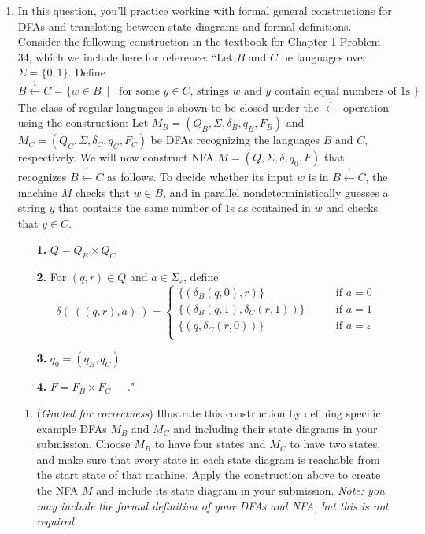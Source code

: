 \documentclass[12pt, oneside]{article}
\begin{document}
\begin{enumerate}
\item In this question, you'll practice working with formal general constructions
for DFAs and translating between state diagrams and formal definitions.
Consider the following
construction in the 
textbook for Chapter 1 Problem 34, which we include here for reference: 
``Let $B$ and $C$ be languages over $\Sigma = \{ 0,1\}$. Define
\[
B \overset{1}{\leftarrow} C= \{ w \in B ~\mid~\textrm{ for some $y \in C$, strings $w$ and $y$ contain equal 
numbers of $1$s }\}
\]
The class of regular languages is shown to be closed under the $\overset{1}{\leftarrow}$ operation
using the construction: Let $M_B = (Q_B, \Sigma, \delta_B, q_B, F_B)$ and $M_C = ( Q_C, \Sigma, \delta_C, q_C, F_C)$ be DFAs recognizing the languages $B$ and $C$, respectively.  We will now construct NFA
$M = (Q, \Sigma, \delta, q_0, F)$ that recognizes $B \overset{1}{\leftarrow} C$ as follows.  To decide
whether its input $w$ is in $B \overset{1}{\leftarrow} C$, the machine $M$ checks that $w \in B$, and 
in parallel nondeterministically guesses a string $y$ that contains the same number of $1$s as 
contained in $w$ and checks that $y \in C$.
\begin{itemize}
\item[{\bf 1.}] $Q = Q_B \times Q_C$
\item[{\bf 2.}] For $(q,r) \in Q$ and $a \in \Sigma_\varepsilon$, define
\[
\delta( ~((q,r), a)~) = \begin{cases}
\{ (\delta_B(q,0) , r ) \}  \qquad&\textrm{if } a = 0 \\
\{ (\delta_B( q,1) ,  \delta_C( r,1) ) \}  \qquad&\textrm{if } a = 1 \\
\{ (q, \delta_C( r,0 ))\}  \qquad&\textrm{if } a = \varepsilon\\
\end{cases}
\]
\item[{\bf 3.}] $q_0 = (q_B, q_C)$
\item[{\bf 4.}] $F = F_B \times F_C$~~~."
\end{itemize}

\begin{enumerate}
\item ({\it Graded for correctness}) Illustrate this construction by defining specific example DFAs $M_B$ and $M_C$ and including 
their state diagrams in your submission.   Choose $M_B$ to have four states and $M_C$
to have two states, and make sure that every state in each state diagram is reachable from the start state
of that machine.
Apply the construction above to create the NFA $M$  and include its state diagram in your submission.
{\it Note: you may 
 include the formal definition of your DFAs and NFA, but this is not required.} 


\end{enumerate}
\end{enumerate}
\end{document}
